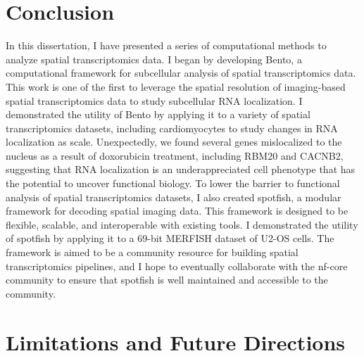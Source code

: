 \begin{dissertationepilogue}

    \setcounter{chapter}{4}
    \setcounter{section}{0}

    \section{Conclusion}

    In this dissertation, I have presented a series of computational methods to analyze spatial transcriptomics data. I began by developing Bento, a computational framework for subcellular analysis of spatial transcriptomics data. This work is one of the first to leverage the spatial resolution of imaging-based spatial transcriptomics data to study subcellular RNA localization. I demonstrated the utility of Bento by applying it to a variety of spatial transcriptomics datasets, including cardiomyocytes to study changes in RNA localization as scale. Unexpectedly, we found several genes mislocalized to the nucleus as a result of doxorubicin treatment, including RBM20 and CACNB2, suggesting that RNA localization is an underappreciated cell phenotype that has the potential to uncover functional biology. To lower the barrier to functional analysis of spatial transcriptomics datasets, I also created spotfish, a modular framework for decoding spatial imaging data. This framework is designed to be flexible, scalable, and interoperable with existing tools. I demonstrated the utility of spotfish by applying it to a 69-bit MERFISH dataset of U2-OS cells. The framework is aimed to be a community resource for building spatial transcriptomics pipelines, and I hope to eventually collaborate with the nf-core community to ensure that spotfish is well maintained and accessible to the community. 

    \section{Limitations and Future Directions}


\end{dissertationepilogue}
